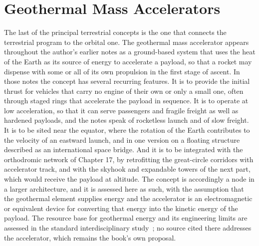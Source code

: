 \chapter{Geothermal Mass Accelerators}
\label{ch:21}

The last of the principal terrestrial concepts is the one that connects the terrestrial program to the orbital one. The geothermal mass accelerator appears throughout the author's earlier notes as a ground-based system that uses the heat of the Earth as its source of energy to accelerate a payload, so that a rocket may dispense with some or all of its own propulsion in the first stage of ascent. In those notes the concept has several recurring features. It is to provide the initial thrust for vehicles that carry no engine of their own or only a small one, often through staged rings that accelerate the payload in sequence. It is to operate at low acceleration, so that it can serve passengers and fragile freight as well as hardened payloads, and the notes speak of rocketless launch and of slow freight. It is to be sited near the equator, where the rotation of the Earth contributes to the velocity of an eastward launch, and in one version on a floating structure described as an international space bridge. And it is to be integrated with the orthodromic network of Chapter 17, by retrofitting the great-circle corridors with accelerator track, and with the skyhook and expandable towers of the next part, which would receive the payload at altitude. The concept is accordingly a node in a larger architecture, and it is assessed here as such, with the assumption that the geothermal element supplies energy and the accelerator is an electromagnetic or equivalent device for converting that energy into the kinetic energy of the payload. The resource base for geothermal energy and its engineering limits are assessed in the standard interdisciplinary study~\cite{tester2006}; no source cited there addresses the accelerator, which remains the book's own proposal.

